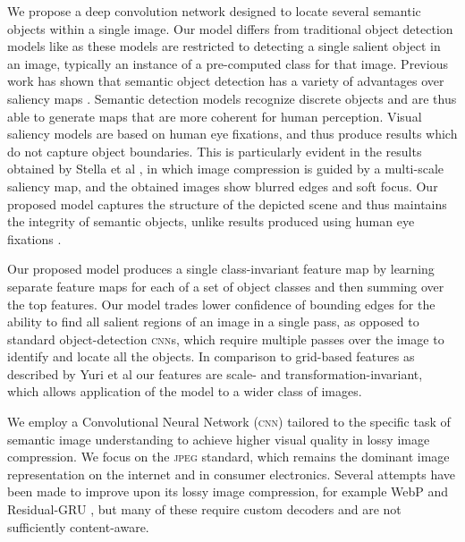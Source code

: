We propose a deep convolution network designed to locate several semantic objects within a single image.
Our model differs from traditional object detection models like \cite{dai2016r} \cite{girshick2014rich} as these models are restricted to detecting a single salient object in an image, typically an instance of a pre-computed class for that image.
Previous work has shown that semantic object detection has a variety of advantages over saliency maps \cite{mnih2014recurrent} \cite{zund2013content}. Semantic detection models recognize discrete objects and are thus able to generate maps that are more coherent for human perception.
Visual saliency models are based on human eye fixations, and thus produce results which do not capture object boundaries.
This is particularly evident in the results obtained by Stella et al \cite{stella2009image}, in which image compression is guided by a multi-scale saliency map, and the obtained images show blurred edges and soft focus.
Our proposed model captures the structure of the depicted scene and thus maintains the integrity of semantic objects, unlike results produced using human eye fixations \cite{liu2015predicting}.


Our proposed model produces a single class-invariant feature map by learning separate feature maps for each of a set of object classes and then summing over the top features.
Our model trades lower confidence of bounding edges for the ability to find all salient regions of an image in a single pass, as opposed to standard object-detection \textsc{cnn}s, which require multiple passes over the image to identify and locate all the objects.
In comparison to grid-based features as described by Yuri et al \cite{reznik2013coding} our features are scale- and transformation-invariant, which allows application of the model to a wider class of images.

We employ a Convolutional Neural Network (\textsc{cnn}) tailored to the specific task of semantic image understanding to achieve higher visual quality in lossy image compression.
We focus on the \textsc{jpeg} standard, which remains the dominant image representation on the internet and in consumer electronics. 
Several attempts have been made to improve upon its lossy image compression, for example WebP \cite{ginesu2012objective} and Residual-GRU \cite{toderici2016full}, but many of these require custom decoders and are not sufficiently content-aware.

